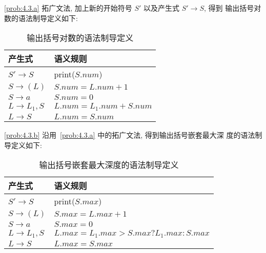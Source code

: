 \documentclass[boxes]{homework}
\begin{document}
\begin{solution}
    \ref{prob:4.3.a} 拓广文法, 加上新的开始符号 $S'$ 以及产生式 $S' \to S$, 得到
    输出括号对数的语法制导定义如下:
    \begin{table}[htbp]
        \centering
        \caption{输出括号对数的语法制导定义}
        \begin{tabular}{ll}
            \toprule
            产生式         & 语义规则                  \\ \midrule
            $S' \to S$     & print($S.num$)            \\
            $S \to (L)$    & $S.num = L.num + 1$       \\
            $S \to a$      & $S.num = 0$               \\
            $L \to L_1, S$ & $L.num = L_1.num + S.num$ \\
            $L \to S$      & $L.num = S.num$           \\ \bottomrule
        \end{tabular}
    \end{table}

    \ref{prob:4.3.b} 沿用~\ref{prob:4.3.a} 中的拓广文法, 得到输出括号嵌套最大深
    度的语法制导定义如下:
    \begin{table}[htbp]
        \centering
        \caption{输出括号嵌套最大深度的语法制导定义}
        \begin{tabular}{ll}
            \toprule
            产生式         & 语义规则                                        \\ \midrule
            $S' \to S$     & print($S.max$)                                  \\
            $S \to (L)$    & $S.max = L.max + 1$                             \\
            $S \to a$      & $S.max = 0$                                     \\
            $L \to L_1, S$ & $L.max = L_{1}.max > S.max ? L_{1}.max : S.max$ \\
            $L \to S$      & $L.max = S.max$                                 \\ \bottomrule
        \end{tabular}
    \end{table}
\end{solution}
\end{document}
